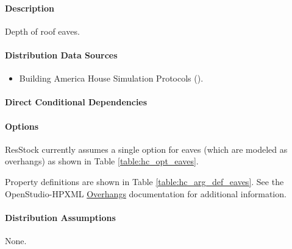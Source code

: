 \paragraph{Description}
% 
Depth of roof eaves.

\paragraph{Distribution Data Sources}
% 
\begin{itemize}
    \item Building America House Simulation Protocols (\cite{Wilson2014}).
\end{itemize}

\paragraph{Direct Conditional Dependencies}


\paragraph{Options}
ResStock currently assumes a single option for eaves (which are modeled as overhangs) as shown in Table \ref{table:hc_opt_eaves}.



Property definitions are shown in Table \ref{table:hc_arg_def_eaves}. See the OpenStudio-HPXML \href{https://openstudio-hpxml.readthedocs.io/en/v1.10.0/workflow_inputs.html#hpxml-overhangs}{Overhangs} documentation for additional information.



\paragraph{Distribution Assumptions}
% 
None.

